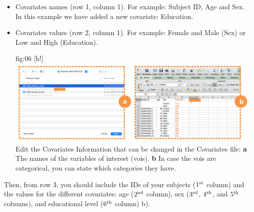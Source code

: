 \documentclass[justified]{tufte-handout}
\begin{document}
\begin{itemize}

\item Covariates names (row 1, column 1). 
For example: Subject ID, Age and Sex. In this example we have added a new covariate: Education.

\item Covariates values (row 2, column 1). 
For example: Female and Male (Sex) or Low and High (Education).

	{fig:06}
	{
	[h!]
	\includegraphics{fig06.png}
	}
	{Edit the Covariates}
	{
	Information that can be changed in the Covariates file: 
	{\bf a} The names of the variables of interest (vois).
	{\bf b} In case the vois are categorical, you can state which categories they have.
	}


\end{itemize}
Then, from row 3, you should include the IDs of your subjects ($1^{\rm st}$ column) and the values for the different covariates: age ($2^{\rm nd}$ column), sex ($3^{\rm rd}$, $4^{\rm th}$, and $5^{\rm th}$ columns), and educational level ($6^{\rm th}$ column) b).	
\end{document}
